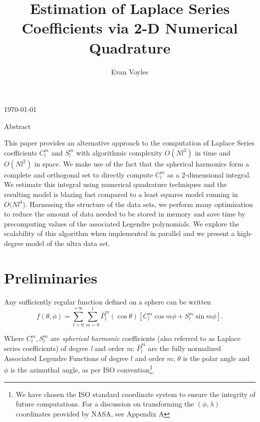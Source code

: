 \documentclass[a4paper]{article}
\title{\Large Estimation of Laplace Series Coefficients via 2-D Numerical Quadrature}
\author{Evan Voyles}
\date{}
\theoremstyle{definition}
\begin{document}
\makeatletter
\maketitle
\begin{center}
    \vspace{-.2in}
    \today
\end{center}
\makeatother

\newenvironment{norm}{
    \normalfont
}


\section{Abstract}

This paper provides an alternative approach to the computation
of Laplace Series coefficients $C_l^m$ and $S_l^m$ with algorithmic complexity $O(Nl^2)$ in time and $O(Nl^2)$ in space. We 
make use of the fact that the spherical harmonics form a complete and orthogonal set to directly
compute $C_l^m$ as a 2-dimensional integral. We estimate this integral using numerical quadrature techniques
and the resulting model is blazing fast compared to a least squares model running in $O(Nl^4$). Harnessing the structure of the 
data sets, we perform many optimization to reduce the amount of data needed to be stored in memory and save time by precomputing values of the 
associated Legendre polynomials. We explore the scalability of this algorithm when implemented in parallel and we present a high-degree model of the
ultra data set.



\section{Preliminaries}

Any sufficiently regular function defined on a sphere can be written
\begin{equation} \label{eq:f_iso}
    f(\theta, \phi) = \sum_{l = 0}^{+\infty}\sum_{m = 0}^l \bar P_l^m(\cos\theta)[C_l^m\cos m\phi + S_l^m \sin m \phi].
\end{equation}

Where $C_l^m, S_l^m$ are \textit{spherical harmonic} coefficients (also referred to as Laplace series coefficients) of 
degree \textit{l} and order \textit{m}; $\bar P_l^m$ are the fully normalized Associated Legendre Functions of degree $l$ and order $m$;
$\theta$ is the polar angle and $\phi$ is the azimuthal angle, as per ISO convention\footnote{We have chosen the ISO standard coordinate system to 
ensure the integrity of future computations. For a discussion on transforming the $(\phi, \lambda)$ coordinates provided by NASA, see Appendix A}.
\end{document}
